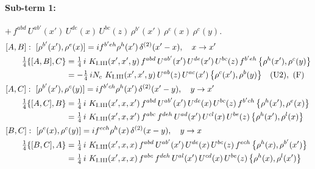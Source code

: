 \documentclass[10pt]{article}
\numberwithin{equation}{section}
\begin{document}
\paragraph{Sub-term 1:} $+\,f^{abd}\,U^{ab'}(x')\,U^{de}(x)\,U^{bc}(z)\,\rho^{b'}(x')\,\rho^{e}(x)\,\rho^{c}(y)$.
\begin{align}
&[A,B]:\ [\rho^{b'}(x'),\rho^{e}(x)]=i f^{b'eh}\rho^{h}(x')\,\delta^{(2)}(x'-x),\quad x\to x'\notag\\
&\qquad \tfrac14\{[A,B],C\}=\tfrac14\,i\,\,K_{\rm I.III}(x',x',y)\,f^{abd}\,U^{ab'}(x')\,U^{de}(x')\,U^{bc}(z)\,f^{b'eh}\,\big\{\rho^{h}(x'),\rho^{c}(y)\big\}\notag\\
&\qquad\phantom{\tfrac14\{[A,B],C\}}=-\tfrac14\,i N_{c}\,\,K_{\rm I.III}(x',x',y)\,U^{ab}(z)\,U^{ac}(x')\,\big\{\rho^{c}(x'),\rho^{b}(y)\big\}\quad\text{(U2)},\ \text{(F)}
\label{R:eq:GI.III-1-AB}\\
&[A,C]:\ [\rho^{b'}(x'),\rho^{c}(y)]=i f^{b'ch}\rho^{h}(x')\,\delta^{(2)}(x'-y),\quad y\to x'\notag\\
&\qquad \tfrac14\{[A,C],B\}=\tfrac14\,i\,\,K_{\rm I.III}(x',x,x')\,f^{abd}\,U^{ab'}(x')\,U^{de}(x)\,U^{bc}(z)\,f^{b'ch}\,\big\{\rho^{h}(x'),\rho^{e}(x)\big\}\notag\\
&\qquad\phantom{\tfrac14\{[A,C],B\}}=\tfrac14\,i\,\,K_{\rm I.III}(x',x,x')\,f^{abc}\,f^{deh}\,U^{ad}(x')\,U^{cl}(x)\,U^{be}(z)\,\big\{\rho^{h}(x'),\rho^{l}(x)\big\}
\label{R:eq:GI.III-1-AC}\\
&[B,C]:\ [\rho^{e}(x),\rho^{c}(y)]=i f^{ech}\rho^{h}(x)\,\delta^{(2)}(x-y),\quad y\to x\notag\\
&\qquad \tfrac14\{[B,C],A\}=\tfrac14\,i\,\,K_{\rm I.III}(x',x,x)\,f^{abd}\,U^{ab'}(x')\,U^{de}(x)\,U^{bc}(z)\,f^{ech}\,\big\{\rho^{h}(x),\rho^{b'}(x')\big\}\notag\\
&\qquad\phantom{\tfrac14\{[B,C],A\}}=\tfrac14\,i\,\,K_{\rm I.III}(x',x,x)\,f^{abc}\,f^{deh}\,U^{al}(x')\,U^{cd}(x)\,U^{be}(z)\,\big\{\rho^{h}(x),\rho^{l}(x')\big\}
\label{R:eq:GI.III-1-BC}
\end{align}
\end{document}
